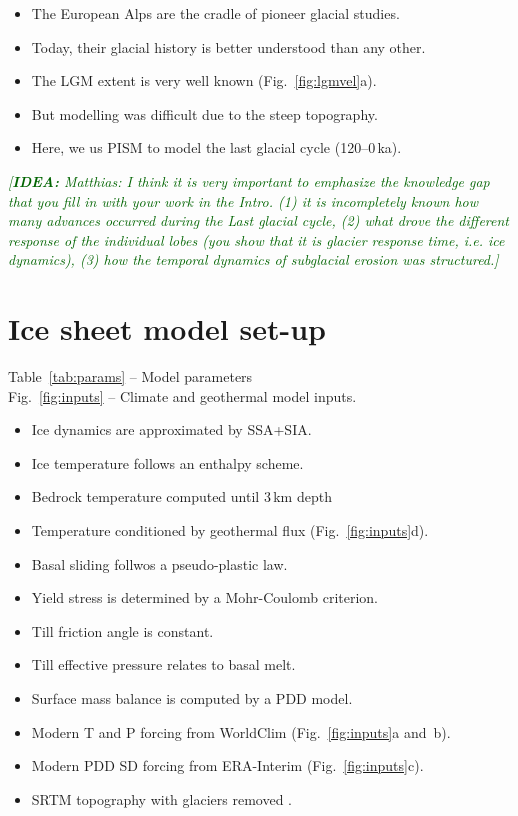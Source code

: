\documentclass{article}
\newcommand{\idea}[1]{\textcolor{darkgreen}{\emph{[\textbf{IDEA:} #1]}}}
\begin{document}
    \begin{itemize}
    \item The European Alps are the cradle of pioneer glacial studies.
    \item Today, their glacial history is better understood than any other.
    \item The LGM extent is very well known (Fig.~\ref{fig:lgmvel}a).
    \item But modelling was difficult due to the steep topography.
    \item Here, we us PISM to model the last glacial cycle (120--0\,ka).
    \end{itemize}

    \idea{Matthias: I think it is very important to emphasize the knowledge gap
          that you fill in with your work in the Intro. (1) it is incompletely
          known how many advances occurred during the Last glacial cycle, (2)
          what drove the different response of the individual lobes (you show
          that it is glacier response time, i.e. ice dynamics), (3) how the
          temporal dynamics of subglacial erosion was structured.}


\section{Ice sheet model set-up}

    Table~\ref{tab:params} -- Model parameters\\
    Fig.~\ref{fig:inputs} -- Climate and geothermal model inputs.\\

    \begin{itemize}
    \item Ice dynamics are approximated by SSA+SIA.
    \item Ice temperature follows an enthalpy scheme.
    \item Bedrock temperature computed until 3\,km depth
    \item Temperature conditioned by geothermal flux (Fig.~\ref{fig:inputs}d).
    \item Basal sliding follwos a pseudo-plastic law.
    \item Yield stress is determined by a Mohr-Coulomb criterion.
    \item Till friction angle is constant.
    \item Till effective pressure relates to basal melt.
    \item Surface mass balance is computed by a PDD model.
    \item Modern T and P forcing from WorldClim (Fig.~\ref{fig:inputs}a and~b).
    \item Modern PDD SD forcing from ERA-Interim (Fig.~\ref{fig:inputs}c).
    \item SRTM topography with glaciers removed \citep{Huss.Farinotti.2012}.
    \end{itemize}
\end{document}
